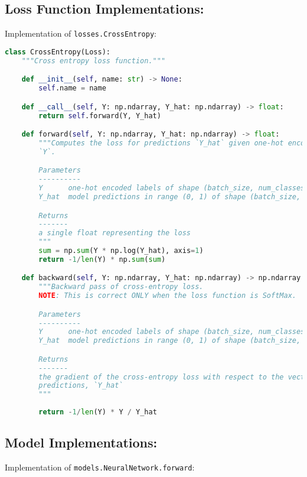 \subsection{Loss Function Implementations:}

Implementation of \texttt{losses.CrossEntropy}:

\begin{lstlisting}[language=Python]
class CrossEntropy(Loss):
    """Cross entropy loss function."""

    def __init__(self, name: str) -> None:
        self.name = name

    def __call__(self, Y: np.ndarray, Y_hat: np.ndarray) -> float:
        return self.forward(Y, Y_hat)

    def forward(self, Y: np.ndarray, Y_hat: np.ndarray) -> float:
        """Computes the loss for predictions `Y_hat` given one-hot encoded labels
        `Y`.

        Parameters
        ----------
        Y      one-hot encoded labels of shape (batch_size, num_classes)
        Y_hat  model predictions in range (0, 1) of shape (batch_size, num_classes)

        Returns
        -------
        a single float representing the loss
        """
        sum = np.sum(Y * np.log(Y_hat), axis=1)
        return -1/len(Y) * np.sum(sum)

    def backward(self, Y: np.ndarray, Y_hat: np.ndarray) -> np.ndarray:
        """Backward pass of cross-entropy loss.
        NOTE: This is correct ONLY when the loss function is SoftMax.

        Parameters
        ----------
        Y      one-hot encoded labels of shape (batch_size, num_classes)
        Y_hat  model predictions in range (0, 1) of shape (batch_size, num_classes)

        Returns
        -------
        the gradient of the cross-entropy loss with respect to the vector of
        predictions, `Y_hat`
        """
        
        return -1/len(Y) * Y / Y_hat

\end{lstlisting}


\subsection{Model Implementations:}

Implementation of \texttt{models.NeuralNetwork.forward}:

